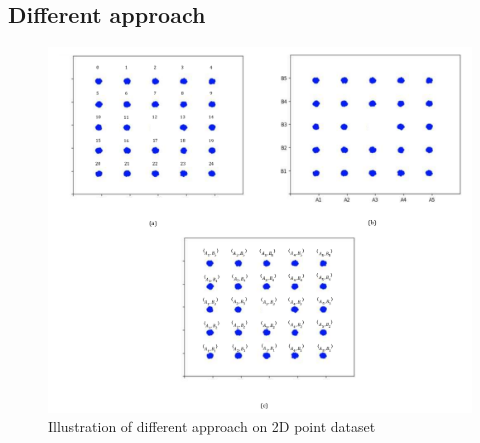 \subsection{Different approach}
\begin{figure} [H]
        \centering
        \includegraphics[width=0.8\linewidth]{figures/2dapproach.pdf}
        \caption{Illustration of different approach on 2D point dataset}
        \label{fig:2dapproach}
    \end{figure}
